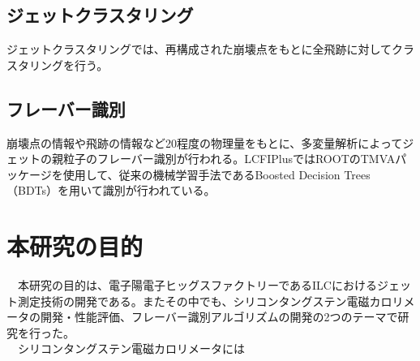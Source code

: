 \subsection{ジェットクラスタリング}
ジェットクラスタリングでは、再構成された崩壊点をもとに全飛跡に対してクラスタリングを行う。
\subsection{フレーバー識別}
崩壊点の情報や飛跡の情報など20程度の物理量をもとに、多変量解析によってジェットの親粒子のフレーバー識別が行われる。LCFIPlusではROOTのTMVAパッケージを使用して、従来の機械学習手法であるBoosted Decision Trees（BDTs）を用いて識別が行われている。
\section{本研究の目的}
　本研究の目的は、電子陽電子ヒッグスファクトリーであるILCにおけるジェット測定技術の開発である。またその中でも、シリコンタングステン電磁カロリメータの開発・性能評価、フレーバー識別アルゴリズムの開発の2つのテーマで研究を行った。\\
　シリコンタングステン電磁カロリメータには
